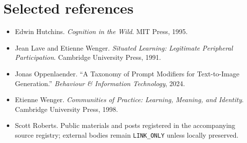 \documentclass[11pt]{article}
\begin{document}
\section*{Selected references}

\begin{itemize}
\item Edwin Hutchins. \emph{Cognition in the Wild}. MIT Press, 1995.
\item Jean Lave and Etienne Wenger. \emph{Situated Learning: Legitimate Peripheral Participation}. Cambridge University Press, 1991.
\item Jonas Oppenlaender. ``A Taxonomy of Prompt Modifiers for Text-to-Image Generation.'' \emph{Behaviour \& Information Technology}, 2024.
\item Etienne Wenger. \emph{Communities of Practice: Learning, Meaning, and Identity}. Cambridge University Press, 1998.
\item Scott Roberts. Public materials and posts registered in the accompanying source registry; external bodies remain \texttt{LINK\_ONLY} unless locally preserved.
\end{itemize}
\end{document}
